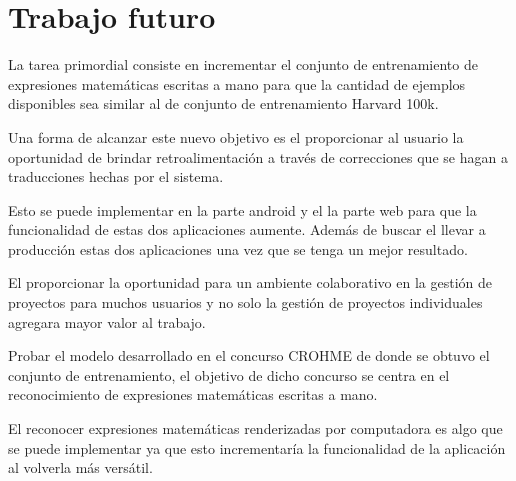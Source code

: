 \chapter{Trabajo futuro}

La tarea primordial consiste en incrementar el conjunto de entrenamiento de expresiones matemáticas escritas a mano para que la cantidad de ejemplos disponibles sea similar al de conjunto de entrenamiento Harvard 100k.

Una forma de alcanzar este nuevo objetivo es el proporcionar al usuario la oportunidad de brindar retroalimentación a través de correcciones que se hagan a traducciones hechas por el sistema.

Esto se puede implementar en la parte android y el la parte web para que la funcionalidad de estas dos aplicaciones aumente. Además de buscar el llevar a producción estas dos aplicaciones una vez que se tenga un mejor resultado.

El proporcionar la oportunidad para un ambiente colaborativo en la gestión de proyectos para muchos usuarios y no solo la gestión de proyectos individuales agregara mayor valor al trabajo.

Probar el modelo desarrollado en el concurso CROHME de donde se obtuvo el conjunto de entrenamiento, el objetivo de dicho concurso se centra en el reconocimiento de expresiones matemáticas escritas a mano.

El reconocer expresiones matemáticas renderizadas por computadora es algo que se puede implementar ya que esto incrementaría la funcionalidad de la aplicación al volverla más versátil.
